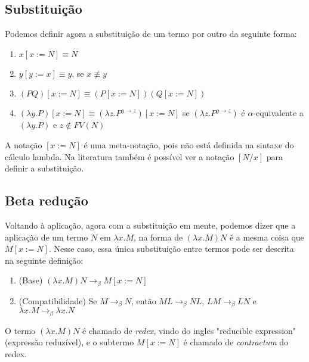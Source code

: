 \documentclass[../main.tex]{subfiles}
\begin{document}
\subsection{Substituição}

Podemos definir agora a substituição de um termo por outro da seguinte forma:

\begin{definition}[Substituição]
    \hfill
    \begin{enumerate}
        \item $x [x := N] \equiv N$
        \item $y [y := x] \equiv y$, se $x \not\equiv y$
        \item $(PQ)[x := N] \equiv (P[x := N])(Q[x := N])$
        \item $(\lambda y . P)[x := N] \equiv (\lambda z . P^{y \to z})[x := N]$ se $(\lambda z . P^{y \to z})$ é $\alpha$-equivalente a $(\lambda y . P)$ e $z \not\in FV(N)$
    \end{enumerate}
\end{definition}

A notação $[x := N]$ é uma meta-notação, pois não está definida na sintaxe do cálculo lambda. Na literatura também é possível ver a notação $[N / x]$ para definir a substituição.

\subsection{Beta redução}

Voltando à aplicação, agora com a substituição em mente, podemos dizer que a aplicação de um termo $N$ em $\lambda x . M$, na forma de $(\lambda x . M)N$ é a mesma coisa que $M [x := N]$. Nesse caso, essa única substituição entre termos pode ser descrita na seguinte definição:

\begin{definition}
    \hfill
    \begin{enumerate}
        \item (Base) $(\lambda x . M)N \to_{\beta} M [x := N]$
        \item (Compatibilidade) Se $M \to_{\beta} N$, então $ML \to_{\beta} NL$, $LM \to_{\beta} LN$ e $\lambda x . M \to_{\beta} \lambda x . N$
    \end{enumerate}
\end{definition}

O termo $(\lambda x . M)N$ é chamado de \emph{redex}, vindo do ingles "reducible expression" (expressão reduzível), e o subtermo $M [x := N]$ é chamado de \emph{contractum} do redex.
\end{document}
